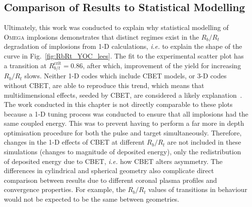 \subsection{Comparison of Results to Statistical Modelling}%
\label{sec:Res1_Stat_Mod_Comp}

Ultimately, this work was conducted to explain why statistical modelling of \textsc{Omega} implosions demonstrates that distinct regimes exist in the $R_b/R_t$ degradation of implosions from 1-D calculations, \textit{i.e.} to explain the shape of the curve in Fig.~\ref{fig:RbRt_YOC_lees}.
The fit to the experimental scatter plot has a transition at $R_{b/t}^{\text{crit}}=0.86$, after which, improvement of the yield for increasing $R_b/R_t$ slows.
Neither 1-D codes which include \ac{CBET} models, or 3-D codes without \ac{CBET}, are able to reproduce this trend, which means that multidimensional effects, seeded by \ac{CBET}, are considered a likely explanation~\cite{gopalaswamy_using_2021}.
The work conducted in this chapter is not directly comparable to these plots because a 1-D tuning process was conducted to ensure that all implosions had the same coupled energy.
This was to prevent having to perform a far more in depth optimisation procedure for both the pulse and target simultaneously.
Therefore, changes in the 1-D effects of \ac{CBET} at different $R_b/R_t$ are not included in these simulations (changes to magnitude of deposited energy), only the redistribution of deposited energy due to \ac{CBET}, \textit{i.e.} how \ac{CBET} alters asymmetry.
The differences in cylindrical and spherical geometry also complicate direct comparison between results due to different coronal plasma profiles and convergence properties.
For example, the $R_b/R_t$ values of transitions in behaviour would not be expected to be the same between geometries.

